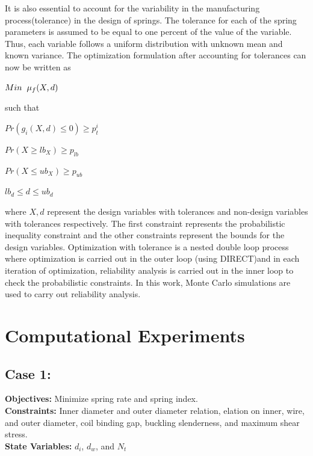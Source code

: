\documentclass[10pt]{article}
\begin{document}
\hspace{5 mm} It is also essential to account for the variability in the manufacturing process(tolerance) in the design of springs. The tolerance for each of the spring parameters is assumed to be equal to one percent of the value of the variable. Thus, each variable follows a uniform distribution with unknown mean and known variance. The optimization formulation after accounting for tolerances can now be written as 

\centerline{$Min \hspace{2mm} \mu_{f} (X,d)$}

such that

\centerline{$Pr(g_{i}(X,d) \leq 0)\geq p_{t}^{i}$}
\centerline{$Pr(X \geq lb_{X})\geq p_{lb}$}
\centerline{$Pr(X \leq ub_{X})\geq p_{ub}$}
\centerline{$lb_{d} \leq d \leq ub_{d}$}

\noindent where $X,d$ represent the design variables with tolerances and non-design variables with tolerances respectively. The first constraint represents the probabilistic inequality constraint and the other constraints represent the bounds for the design variables. Optimization with tolerance is a nested double loop process where optimization is carried out in the outer loop (using DIRECT)and in each iteration of optimization, reliability analysis is carried out in the inner loop to check the probabilistic constraints. In this work, Monte Carlo simulations are used to carry out reliability analysis. 

\cite{Derivative} \cite{DirectPaper} \cite{MATLAB:2014a} \cite{DirectUserGuide}
 
 

\section{Computational Experiments}
\label{sec:Experiments}

\newpage
\subsection{Case 1:}
\label{sec:Case1}
	\textbf{Objectives:} Minimize spring rate and spring index.\\
	\textbf{Constraints:} Inner diameter and outer diameter relation, elation on inner, wire, and outer diameter, coil binding gap, buckling slenderness, and maximum shear stress. \\
	\textbf{State Variables:} $d_{i}$, $d_{w}$, and $N_{t}$ \\
\end{document}

